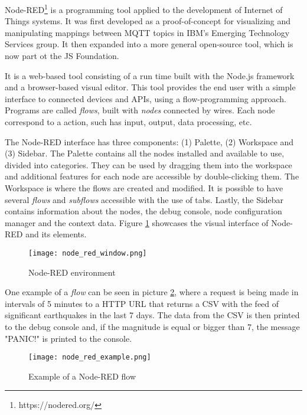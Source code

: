 Node-RED\footnote{https://nodered.org/} is a programming tool applied to the development of Internet of Things systems. It was first developed as a proof-of-concept for visualizing and manipulating mappings between MQTT topics in IBM's Emerging Technology Services group. It then expanded into a more general open-source tool, which is now part ot the JS Foundation.
\par It is a web-based tool consisting of a run time built with the Node.js framework and a browser-based visual editor. This tool provides the end user with a simple interface to connected devices and APIs, using a flow-programming approach. Programs are called \emph{flows}, built with \emph{nodes} connected by wires. Each node correspond to a action, such has input, output, data processing, etc. 
\par The Node-RED interface has three components: (1) Palette, (2) Workspace and (3) Sidebar. The Palette contains all the nodes installed and available to use, divided into categories. They can be used by dragging them into the workspace and additional features for each node are accessible by double-clicking them. The Workspace is where the flows are created and modified. It is possible to have several \emph{flows} and \emph{subflows} accessible with the use of tabs. Lastly, the Sidebar contains information about the nodes, the debug console, node configuration manager and the context data. Figure \ref{fig:node_red_window} showcases the visual interface of Node-RED and its elements.

\begin{figure}[h]
\caption{Node-RED environment}
\label{fig:node_red_window}
\centering
\texttt{[image: node\_red\_window.png]}
\end{figure}

\par One example of a \emph{flow} can be seen in picture \ref{fig:node_red_example}, where a request is being made in intervals of 5 minutes to a HTTP URL that returns a CSV with the feed of significant earthquakes in the last 7 days. The data from the CSV is then printed to the debug console and, if the magnitude is equal or bigger than 7, the message "PANIC!" is printed to the console. 

\begin{figure}[!h]
\caption{Example of a Node-RED flow}
\label{fig:node_red_example}
\centering
\texttt{[image: node\_red\_example.png]}
\end{figure}

